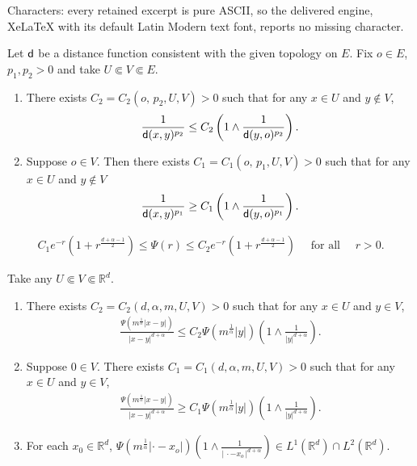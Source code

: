 \documentclass[10pt,a4paper]{amsart}
\newcommand{\R}{\mathbb{R}}
\begin{document}
Characters: every retained excerpt is pure ASCII, so the delivered engine, XeLaTeX with its default Latin Modern text font, reports no missing character.
\begin{lem}\label{lem:jumpkernelequivalence}
Let ${\sf d}$ be a distance function consistent with the given topology on 
 $E$. 
Fix $o\in E$, $p_1,p_2>0$ and take $U\Subset V\Subset E$. 
\begin{enumerate}
\item[\rm(1)] There exists $C_2=C_2(o,\, p_2,U,V)>0$ such that for any $x\in U$ and $y\notin V$,
\begin{align*}
\frac{1}{{\sf d}(x,y)^{p_2}}\leq C_2\left(1\land\frac{1}{{\sf d}(y,o)^{p_2}} \right).
\end{align*}
\item[\rm(2)] Suppose $o\in V$. Then there exists $C_1=C_1(o,\, p_1,U,V)>0$ such that for any $x\in U$ and $y\notin V$
\begin{align*}
\frac{1}{{\sf d}(x,y)^{p_1}}\geq C_1\left(1\land\frac{1}{{\sf d}(y,o)^{p_1}} \right).
\end{align*}
\end{enumerate}
\end{lem}

\begin{align}
C_1e^{-r}(1+r^{\frac{d+\alpha-1}{2}})\leq \Psi(r)\leq C_2e^{-r}(1+r^{\frac{d+\alpha-1}{2}})\quad\text{ for all }\quad r>0.\label{eq:LowerBoundsPhi}
\end{align}

\begin{lem}\label{lem:CharacRelativiStabel}
Take any $U\Subset V\Subset \R^d$. 
\begin{enumerate}
\item[\rm(1)] There exists $C_2=C_2(d,\alpha,m,U,V)>0$ such that for any $x\in U$ and $y\in V$, 
\begin{align*}
\frac{\Psi(m^{\frac{1}{\alpha}}|x-y|)}{|x-y|^{d+\alpha}}\leq C_2\Psi(m^{\frac{1}{\alpha}}|y|)\left(1\land\frac{1}{|y|^{d+\alpha}} \right).
\end{align*}
\item[\rm(2)] Suppose $0\in V$. There exists $C_1=C_1(d,\alpha,m,U,V)>0$ such that for any $x\in U$ and $y\in V$,
\begin{align*}
\frac{\Psi(m^{\frac{1}{\alpha}}|x-y|)}{|x-y|^{d+\alpha}}\geq C_1
\Psi(m^{\frac{1}{\alpha}}|y|)
\left(1\land\frac{1}{|y|^{d+\alpha}}\right).
\end{align*}
\item[\rm(3)] 
For each $x_0\in\R^d$, 
$\Psi(m^{\frac{1}{\alpha}}|\cdot-x_o|)\left(1\land\frac{1\;\,}{|\,\cdot-x_o\,|^{d+\alpha}} \right)\in L^1(\R^d)\cap L^2(\R^d)$.
\end{enumerate}
\end{lem}
\end{document}
